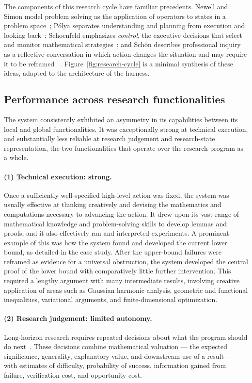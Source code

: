 The components of this research cycle have familiar precedents. Newell and Simon model problem
solving as the application of operators to states in a problem
space~\cite{newell1972human}; P\'olya separates understanding and planning
from execution and looking back~\cite{polya1957solve}; Schoenfeld emphasizes
\emph{control}, the executive decisions that select and monitor mathematical
strategies~\cite{schoenfeld1983episodes,schoenfeld1985mathematical}; and
Sch\"on describes professional inquiry as a reflective conversation in which
action changes the situation and may require it to be reframed
~\cite{schon1983reflective}. Figure~\ref{fig:research-cycle} is a minimal synthesis of these ideas, adapted to the architecture of the harness.

\subsection{Performance across research functionalities}

The system consistently exhibited an asymmetry in its capabilities between its local and global functionalities. It was exceptionally strong at
technical execution, and substantially less reliable at research judgement and research-state representation, the two functionalities that operate over the research program as a whole.

\paragraph{(1) Technical execution: strong.}
Once a sufficiently well-specified high-level action was fixed, the system was
usually effective at thinking creatively and devising the mathematics and computations necessary to advancing the action. It drew upon its vast range of
mathematical knowledge and problem-solving skills to develop lemmas and proofs, and it also effectively ran and interpreted experiments. A prominent example of this was how the system found and developed the current lower bound, as detailed in the case study. After the upper-bound failures were reframed as evidence for a
universal obstruction, the system developed the central proof of the lower
bound with comparatively little further intervention. This required a lengthy argument with many intermediate results, involving creative application of areas such as Gaussian harmonic analysis, geometric and functional inequalities, variational arguments, and finite-dimensional optimization. 


\paragraph{(2) Research judgement: limited autonomy.}
Long-horizon research requires repeated decisions about what the program
should do next~\cite{tao2007good,thurston1994proof}. These decisions combine mathematical valuation --- the
expected significance, generality, explanatory value, and downstream use of
a result --- with estimates of difficulty, probability of success, information
gained from failure, verification cost, and opportunity cost.

